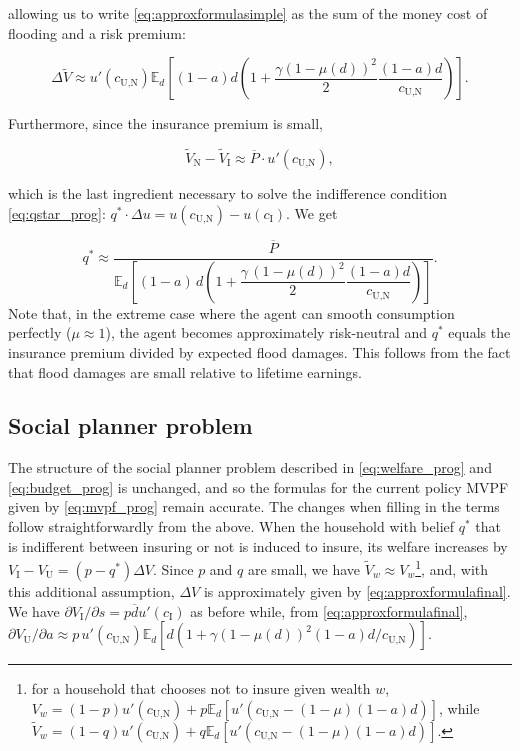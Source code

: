 \documentclass[12pt]{article}
\begin{document}
allowing us to write \eqref{eq:approxformulasimple} as the sum of the money cost of flooding and a risk premium: 

\begin{equation}\label{eq:approxformulafinal}
\Delta \tilde{V} \approx u'(c_{\text{U,N}})\mathbb{E}_d[(1-a)d(1+\frac{\gamma(1-\mu(d))^2}{2}\frac{(1-a)d}{c_{\text{U,N}}})].
\end{equation}

Furthermore, since the insurance premium is small,

\begin{equation}
\tilde{V}_{\text{N}}-\tilde{V}_{\text{I}}\approx\overline{P} \cdot u'(c_{\text{U,N}}),
\end{equation}

which is the last ingredient necessary to solve the indifference condition \eqref{eq:qstar_prog}: $q^*\cdot\Delta u = u(c_{\text{U,N}}) - u(c_{\text{I}})$. We get

\begin{equation}
q^*\approx\frac{\overline{P}}{\mathbb{E}_d\!\left[(1-a)\,d\left(1+\dfrac{\gamma\,(1-\mu(d))^2}{2}\dfrac{(1-a)d}{c_{\text{U,N}}}\right)\right]}.
\end{equation}
Note that, in the extreme case where the agent can smooth consumption perfectly ($\mu\approx1$), the agent becomes approximately risk-neutral and $q^*$ equals the insurance premium divided by expected flood damages. This follows from the fact that flood damages are small relative to lifetime earnings. 

\subsection{Social planner problem}

The structure of the social planner problem described in \eqref{eq:welfare_prog} and \eqref{eq:budget_prog} is unchanged, and so the formulas for the current policy MVPF given by \eqref{eq:mvpf_prog} remain accurate. The changes when filling in the terms follow straightforwardly from the above. When the household with belief $q^*$ that is indifferent between insuring or not is induced to insure, its welfare increases by $V_\text{I}-V_\text{U}=(p-q^*)\Delta V$. Since $p$ and $q$ are small, we have $\tilde V_w\approx V_w$\footnote{for a household that chooses not to insure given wealth $w$, $V_w=(1-p)u'(c_{\text{U,N}})+p\mathbb{E}_d[u'(c_\text{U,N}-(1-\mu)(1-a)d)]$, while $\tilde{V}_w=(1-q)u'(c_{\text{U,N}})+q\mathbb{E}_d[u'(c_\text{U,N}-(1-\mu)(1-a)d)]$.}, and, with this additional assumption, $\Delta V$ is approximately given by \eqref{eq:approxformulafinal}. We have $\partial V_\text{I}/\partial s=p\overline{d}u'(c_{\text{I}})$ as before while, from \eqref{eq:approxformulafinal}, $\partial V_\text{U}/\partial a\approx p\,u'(c_{\text{U,N}})\mathbb{E}_d[d(1+\gamma(1-\mu(d))^2(1-a)d/c_{\text{U,N}})]$.
\end{document}
